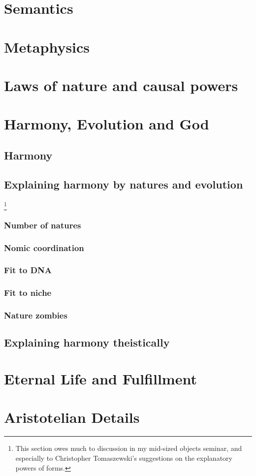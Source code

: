 \chapter{Semantics}\label{ch:semantics}
\chaptertail

\def\mychapter{VI}

\chapter{Metaphysics}\label{ch:metaphysics}
\chaptertail 

\def\mychapter{VII}

\chapter{Laws of nature and causal powers}\label{ch:laws}
\chaptertail

\def\mychapter{VIII}

\chapter{Harmony, Evolution and God}\label{ch:God}
\section{Harmony}
\section{Explaining harmony by natures and evolution}
\footnote{This section owes much to discussion in my mid-sized objects seminar, and especially to Christopher Tomaszewski's suggestions on the explanatory powers of forms.}
\subsection{Number of natures}
\subsection{Nomic coordination}
\subsection{Fit to DNA}
\subsection{Fit to niche}
\subsection{Nature zombies}
\section{Explaining harmony theistically}
\chaptertail

\def\mychapter{IX}

\chapter{Eternal Life and Fulfillment}\label{ch:eternal-life}
\chaptertail

\def\mychapter{X}

\chapter{Aristotelian Details}\label{ch:details}
\chaptertail
